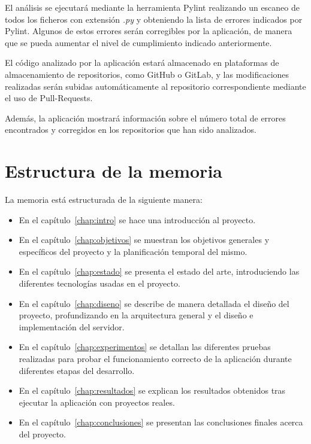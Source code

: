 \documentclass[a4paper, 12pt]{book}
\begin{document}
El análisis se ejecutará mediante la herramienta Pylint realizando un escaneo de todos los ficheros con extensión \textit{.py} y obteniendo la lista de errores indicados por Pylint.
Algunos de estos errores serán corregibles por la aplicación, de manera que se pueda aumentar el nivel de cumplimiento indicado anteriormente.

El código analizado por la aplicación estará almacenado en plataformas de almacenamiento de repositorios, como GitHub o GitLab, y las modificaciones realizadas serán subidas automáticamente al repositorio correspondiente mediante el uso de Pull-Requests.

Además, la aplicación mostrará información sobre el número total de errores encontrados y corregidos en los repositorios que han sido analizados.


\section{Estructura de la memoria}
\label{sec:estructura}

La memoria está estructurada de la siguiente manera:

\begin{itemize}
  \item En el capítulo~\ref{chap:intro} se hace una introducción al proyecto.
  \item En el capítulo~\ref{chap:objetivos} se muestran los objetivos generales y específicos del proyecto y la planificación temporal del mismo.
  \item En el capítulo~\ref{chap:estado} se presenta el estado del arte, introduciendo las diferentes tecnologías usadas en el proyecto.
  \item En el capítulo~\ref{chap:diseno} se describe de manera detallada el diseño del proyecto, profundizando en la arquitectura general y el diseño e implementación del servidor.
  \item En el capítulo~\ref{chap:experimentos} se detallan las diferentes pruebas realizadas para probar el funcionamiento correcto de la aplicación durante diferentes etapas del desarrollo.
  \item En el capítulo~\ref{chap:resultados} se explican los resultados obtenidos tras ejecutar la aplicación con proyectos reales. 
  \item En el capítulo~\ref{chap:conclusiones} se presentan las conclusiones finales acerca del proyecto.
\end{itemize}
\end{document}
